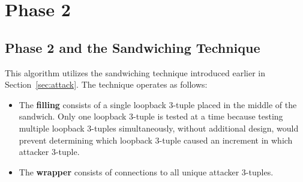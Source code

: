 \documentclass{report}
\begin{document}
%
%
%
%
%
%
%
%

\section{Phase 2}
\label{sec:phase 2}

\subsection*{Phase 2 and the Sandwiching Technique}

This algorithm utilizes the sandwiching technique introduced earlier in Section~\ref{sec:attack}. The technique operates as follows:

\begin{itemize}
    \item The \textbf{filling} consists of a single loopback 3-tuple placed in the middle of the sandwich. Only one loopback 3-tuple is tested at a time because testing multiple loopback 3-tuples simultaneously, without additional design, would prevent determining which loopback 3-tuple caused an increment in which attacker 3-tuple.
    
    \item The \textbf{wrapper} consists of connections to all unique attacker 3-tuples.
\end{itemize}
\end{document}
